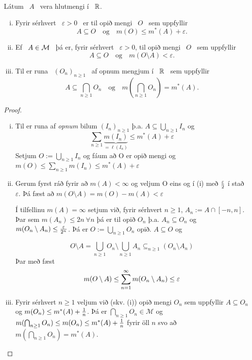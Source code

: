 \documentclass[12pt]{report}
\newcommand{\cM}{\mathcal{M}}
\newcommand{\M}{{\cal M}}
\begin{document}
\begin{setn*}
Látum \ $A$ \ vera hlutmengi í \ $\mathbb{R}$.
\begin{enumerate}[(i)]
\medskip
\item
Fyrir sérhvert \ $\varepsilon > 0$ \ er til opið mengi \ $O$ \ sem uppfyllir
\[
A\subseteq O\quad\text{og}\quad m(O)\leq m^*(A) + \varepsilon.
\]
\item
Ef \ $A\in\M$ \ þá er, fyrir sérhvert \ $\varepsilon > 0$,  til opið mengi \ $O$ \ sem uppfyllir 
\[
A\subseteq O\quad\text{og}\quad m(O\setminus A) < \varepsilon.
\]
\item
Til er runa \ $(O_n)_{n\geq 1}$ \ af opnum mengjum í \ $\mathbb{R}$ \ sem uppfyllir
\[
A\subseteq\bigcap_{n\geq 1}O_n\quad\text{og}\quad m\left(\bigcap_{n\geq 1}O_n\right) = m^*(A).
\] 
\end{enumerate}
\end{setn*}
    \begin{proof}
      \begin{enumerate}[(i)]
      \item Til er runa af \emph{opnum} bilum
        $(I_n)_{n \geq 1}$ þ.a.
        $A \subseteq \bigcup_{n \geq 1} I_n$ og
        \[ \sum_{n \geq 1} \underbrace{m(I_n)}_{= \ell(I_n)}
        \leq m^*(A) + \varepsilon \]
        Setjum $O := \bigcup_{n \geq 1} I_n$ og fáum að O er
        opið mengi og
        $ m(O) \leq \sum_{n \geq 1} m(I_n) \leq m^*(A) +
        \varepsilon$
      \item Gerum fyrst ráð fyrir að $m(A) < \infty$ og veljum
        O eins og í (i) með $\frac{\varepsilon}{2}$ í stað
        $\varepsilon$.  Þá fæst að
        $m(O \setminus A) = m(O) - m(A) < \varepsilon$

        Í tilfellinu $m(A) = \infty$ setjum við, fyrir
        sérhvert $n \geq 1$, $A_n := A \cap [-n,n]$.  Þar sem
        $m(A_n) \leq 2 n \: \forall n$ þá er til opið $O_n$
        þ.a. $A_n \subseteq O_n$ og
        $m(O_n \setminus A_n) \leq \frac{\varepsilon}{2^n}$.  Þá
        er $O := \bigcup_{n \geq 1} O_n$ opið.
        $A \subseteq O$ og

        \[O \setminus A = \bigcup_{n \geq 1} O_n \setminus
        \bigcup_{n \geq 1} A_n \subseteq_{n \geq 1} (O_n
        \setminus A_n)\]
        Þar með fæst
        \[ m(O \setminus A) \leq \sum_{n = 1}^{\infty} m(O_n \setminus
        A_n) \leq \varepsilon \]

      \item Fyrir sérhvert $n \geq 1$ veljum við (skv. (i))
        opið mengi $O_n$ sem uppfyllir $A \subseteq O_n$ og
        $m(O_n) \leq m^*(A) + \frac{1}{n}$. Þá er
        $\bigcap_{n\geq 1} O_n \in \cM$ og
        $m(\bigcap_{n\geq 1} O_n) \leq m(O_n) \leq m^*(A) +
        \frac{1}{n} $
        fyrir öll $n$ svo að
        $m(\bigcap_{n \geq 1} O_n) = m^*(A)$.

      \end{enumerate}
    \end{proof}
\end{document}
